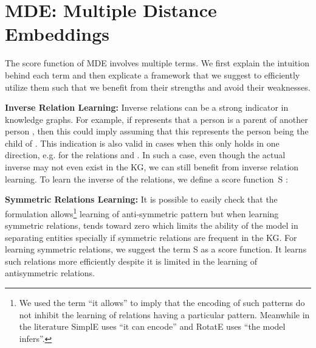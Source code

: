 \documentclass{ecai}
\begin{document}
\section{MDE: Multiple Distance Embeddings}
\label{sec:MDE Multiple Distance Embeddings}
The score function of MDE involves multiple terms. We first explain the intuition behind each term and then explicate a framework that we suggest to efficiently utilize them such that we benefit from their strengths and avoid their weaknesses.

\textbf{Inverse Relation Learning:} Inverse relations can be a strong indicator in knowledge graphs. For example, if  represents that a person  is a parent of another person , then this could imply  assuming that this represents the person  being the child of . This indication is also valid in cases when this only holds in one direction, e.g. for the relations  and . In such a case, even though the actual inverse  may not even exist in the KG, we can still benefit from inverse relation learning.  
To learn the inverse of the relations, we define a score function~S :



\textbf{Symmetric Relations Learning:} It is possible to easily check that the formulation  allows\footnote{We used the term ``it allows'' to imply that the encoding of such patterns do not inhibit the learning of relations having a particular pattern. Meanwhile in the literature SimplE uses ``it can encode'' and RotatE uses ``the model infers''.} learning of anti-symmetric pattern but when learning symmetric relations,  tends toward zero which limits the ability of the model in separating entities specially if symmetric relations are frequent in the KG. 
For learning  symmetric relations, we suggest the term S as a score function. It learns such relations more efficiently despite it is limited in the learning of antisymmetric relations. 
\end{document}
